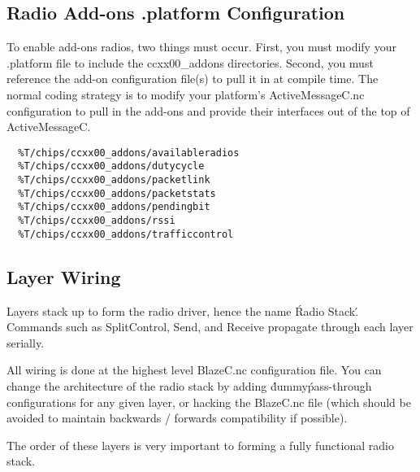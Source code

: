 \documentclass{article}
\begin{document}
\subsection{Radio Add-ons .platform Configuration}
To enable add-ons radios, two things must occur. First, you must modify your .platform file to include the ccxx00\_addons directories. Second, you must reference the add-on configuration file(s) to pull it in at compile time. The normal coding
strategy is to modify your platform's ActiveMessageC.nc configuration to pull in the add-ons and provide their interfaces
out of the top of ActiveMessageC.

\begin{verbatim}
  %T/chips/ccxx00_addons/availableradios
  %T/chips/ccxx00_addons/dutycycle
  %T/chips/ccxx00_addons/packetlink
  %T/chips/ccxx00_addons/packetstats
  %T/chips/ccxx00_addons/pendingbit
  %T/chips/ccxx00_addons/rssi
  %T/chips/ccxx00_addons/trafficcontrol
\end{verbatim}

\subsection{Layer Wiring}
Layers stack up to form the radio driver, hence the name \'Radio Stack\'. Commands
such as SplitControl, Send, and Receive propagate through each layer serially.

All wiring is done at the highest level BlazeC.nc configuration file. You can 
change the architecture of the radio stack by adding \'dummy\' pass-through configurations
for any given layer, or hacking the BlazeC.nc file (which should be avoided to maintain
backwards / forwards compatibility if possible).

The order of these layers is very important to forming a fully functional radio stack.
\end{document}

